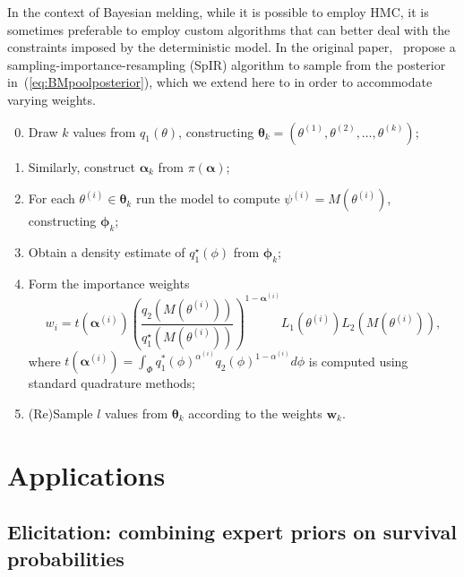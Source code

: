 \documentclass[a4paper, notitlepage, 10pt]{article}
\begin{document}
In the context of Bayesian melding, while it is possible to employ HMC, it is sometimes preferable to employ custom algorithms that can better deal with the constraints imposed by the deterministic model.
In the original paper,~\cite[sec. 3.4]{poole2000} propose a sampling-importance-resampling (SpIR) algorithm to sample from the posterior in~(\ref{eq:BMpoolposterior}), which we extend here to in order to accommodate varying weights.
\begin{enumerate}
\setcounter{enumi}{-1}
 \item Draw $k$ values from  $q_1(\theta)$, constructing $\boldsymbol \theta_k = (\theta^{(1)}, \theta^{(2)}, \ldots, \theta^{(k)} )$;
 \item Similarly, construct $\boldsymbol \alpha_k$ from $\pi(\boldsymbol \alpha)$;
 \item For each $\theta^{(i)} \in \boldsymbol\theta_k$ run the model to compute $\psi^{(i)} = M(\theta^{(i)})$, constructing $\boldsymbol \phi_k$;
 \item Obtain a density estimate of $q_1^\star(\phi)$ from  $\boldsymbol \phi_k$;
 \item Form the importance weights 
 \begin{equation}
 \label{eq:SpIRweights}
  w_i = t\left(\boldsymbol \alpha^{(i)}\right) \left(\frac{q_2(M(\theta^{(i)}))}{q_1^\star(M(\theta^{(i)}))}\right)^{1 - \boldsymbol \alpha^{(i)}} L_1(\theta^{(i)}) L_2(M(\theta^{(i)})),
 \end{equation}
where $t\left(\boldsymbol \alpha^{(i)}\right) = \int_{\Phi} q_1^\ast(\phi)^{\alpha^{(i)}} q_2(\phi)^{1-\alpha^{(i)}} d\phi$ is computed using standard quadrature methods;
 \item (Re)Sample $l$ values from $\boldsymbol \theta_k$ according to the weights $\boldsymbol w_k$.
\end{enumerate}

\section{Applications}
\label{sec:apps}

\subsection{Elicitation: combining expert priors on survival probabilities}
\label{sec:survivalProbs}
\end{document}
